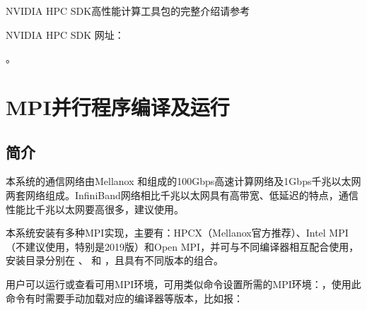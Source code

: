\documentclass[a4paper,12pt,english]{sphinxmanual}
\begin{document}
\sphinxAtStartPar
NVIDIA HPC SDK高性能计算工具包的完整介绍请参考 %
\begin{footnote}[6]\sphinxAtStartFootnote
NVIDIA HPC SDK
网址：
%
\end{footnote}。

\sphinxstepscope


\chapter{MPI并行程序编译及运行}
\label{\detokenize{mpi-application/mpi-application:mpi}}\label{\detokenize{mpi-application/mpi-application::doc}}

\section{简介}
\label{\detokenize{mpi-application/mpi-application:id1}}
\sphinxAtStartPar
本系统的通信网络由Mellanox 和组成的100Gbps高速计算网络及1Gbps千兆以太网两套网络组成。InfiniBand网络相比千兆以太网具有高带宽、低延迟的特点，通信性能比千兆以太网要高很多，建议使用。

\sphinxAtStartPar
本系统安装有多种MPI实现，主要有：HPC\sphinxhyphen{}X（Mellanox官方推荐）、Intel MPI（不建议使用，特别是2019版）和Open MPI，并可与不同编译器相互配合使用，安装目录分别在  、  和  ，且具有不同版本的组合。

\sphinxAtStartPar
用户可以运行或查看可用MPI环境，可用类似命令设置所需的MPI环境：，使用此命令有时需要手动加载对应的编译器等版本，比如报：

\begin{sphinxVerbatim}[commandchars=\\\{\}]
        
      
\end{sphinxVerbatim}
\end{document}
